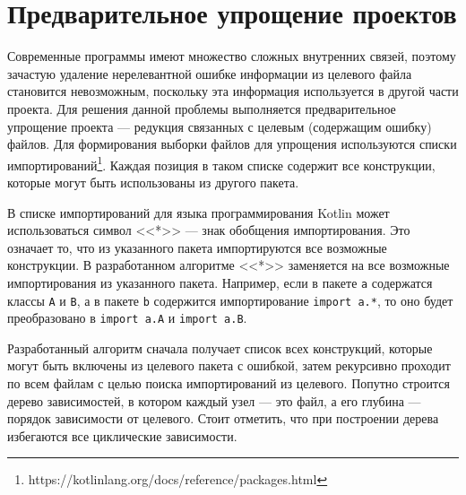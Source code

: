 \section{Предварительное упрощение проектов}
Современные программы имеют множество сложных внутренних связей, поэтому зачастую удаление нерелевантной ошибке информации из целевого файла становится невозможным, поскольку эта информация используется в другой части проекта. Для решения данной проблемы выполняется предварительное упрощение проекта --- редукция связанных с целевым (содержащим ошибку) файлов. Для формирования выборки файлов для упрощения используются списки импортирований\footnote{https://kotlinlang.org/docs/reference/packages.html}. Каждая позиция в таком списке содержит все конструкции, которые могут быть использованы из другого пакета. 

В списке импортирований для языка программирования Kotlin может использоваться символ <<*>> --- знак обобщения импортирования. Это означает то, что из указанного пакета импортируются все возможные конструкции. В разработанном алгоритме <<*>> заменяется на все возможные импортирования из указанного пакета. Например, если в пакете \texttt{a} содержатся классы \texttt{A} и \texttt{B}, а в пакете \texttt{b} содержится импортирование \texttt{import a.*}, то оно будет преобразовано в \texttt{import a.A} и \texttt{import a.B}.

Разработанный алгоритм сначала получает список всех конструкций, которые могут быть включены из целевого пакета с ошибкой, затем рекурсивно проходит по всем файлам с целью поиска импортирований из целевого. Попутно строится дерево зависимостей, в котором каждый узел --- это файл, а его глубина --- порядок зависимости от целевого. Стоит отметить, что при построении дерева избегаются все циклические зависимости.

